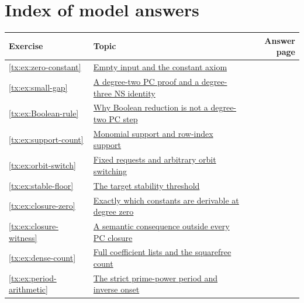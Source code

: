 \section*{Index of model answers}
\begin{longtable}{@{}lp{}r@{}}
\toprule
Exercise & Topic & Answer page\\
\midrule

\ref{tx:ex:zero-constant} & \hyperref[tx:ans:zero-constant]{Empty input and the constant axiom} & \pageref{tx:ans:zero-constant}\\

\ref{tx:ex:small-gap} & \hyperref[tx:ans:small-gap]{A degree-two PC proof and a degree-three NS identity} & \pageref{tx:ans:small-gap}\\

\ref{tx:ex:Boolean-rule} & \hyperref[tx:ans:Boolean-rule]{Why Boolean reduction is not a degree-two PC step} & \pageref{tx:ans:Boolean-rule}\\

\ref{tx:ex:support-count} & \hyperref[tx:ans:support-count]{Monomial support and row-index support} & \pageref{tx:ans:support-count}\\

\ref{tx:ex:orbit-switch} & \hyperref[tx:ans:orbit-switch]{Fixed requests and arbitrary orbit switching} & \pageref{tx:ans:orbit-switch}\\

\ref{tx:ex:stable-floor} & \hyperref[tx:ans:stable-floor]{The target stability threshold} & \pageref{tx:ans:stable-floor}\\

\ref{tx:ex:closure-zero} & \hyperref[tx:ans:closure-zero]{Exactly which constants are derivable at degree zero} & \pageref{tx:ans:closure-zero}\\

\ref{tx:ex:closure-witness} & \hyperref[tx:ans:closure-witness]{A semantic consequence outside every PC closure} & \pageref{tx:ans:closure-witness}\\

\ref{tx:ex:dense-count} & \hyperref[tx:ans:dense-count]{Full coefficient lists and the squarefree count} & \pageref{tx:ans:dense-count}\\

\ref{tx:ex:period-arithmetic} & \hyperref[tx:ans:period-arithmetic]{The strict prime-power period and inverse onset} & \pageref{tx:ans:period-arithmetic}\\


\end{longtable}
